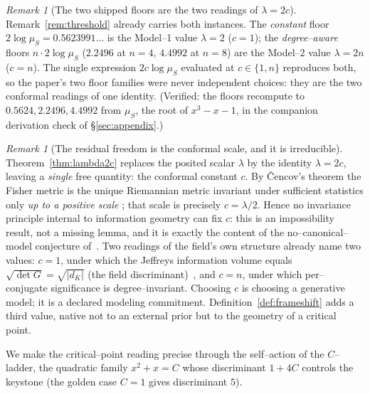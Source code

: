 \documentclass[11pt]{article}
\theoremstyle{plain}
\theoremstyle{definition}
\theoremstyle{remark}
\newtheorem{remark}[theorem]{Remark}
\newcommand{\K}{K}
\newcommand{\GG}{G}
\begin{document}
\begin{remark}[The two shipped floors are the two readings of $\lambda=2c$]\label{rem:floorsunify}
Remark~\ref{rem:threshold} already carries both instances. The \emph{constant} floor $2\log\mu_S=0.5623991\ldots$
is the Model--1 value $\lambda=2$ ($c=1$); the \emph{degree--aware} floors $n\cdot2\log\mu_S$ ($2.2496$ at $n=4$,
$4.4992$ at $n=8$) are the Model--2 value $\lambda=2n$ ($c=n$). The single expression $2c\log\mu_S$ evaluated at
$c\in\{1,n\}$ reproduces both, so the paper's two floor families were never independent choices: they are the two
conformal readings of one identity. (Verified: the floors recompute to $0.5624,2.2496,4.4992$ from $\mu_S$, the
root of $x^3-x-1$, in the companion derivation check of \S\ref{sec:appendix}.)
\end{remark}

\begin{remark}[The residual freedom is the conformal scale, and it is irreducible]\label{rem:cencov}
Theorem~\ref{thm:lambda2c} replaces the posited scalar $\lambda$ by the identity $\lambda=2c$, leaving a
\emph{single} free quantity: the conformal constant $c$. By \v{C}encov's theorem the Fisher metric is the unique
Riemannian metric invariant under sufficient statistics only \emph{up to a positive scale} \cite{Cencov}; that
scale is precisely $c=\lambda/2$. Hence no invariance principle internal to information geometry can fix $c$:
this is an impossibility result, not a missing lemma, and it is exactly the content of the no--canonical--model
conjecture of~\cite{VectorSubstrate}. Two readings of the field's own structure already name two values: $c=1$, under which
the Jeffreys information volume equals $\sqrt{\det\GG}=\sqrt{|d_\K|}$ (the field discriminant)~\cite{Jeffreys,
VectorSubstrate}, and $c=n$, under which per--conjugate significance is degree--invariant. Choosing $c$ is
choosing a generative model; it is a declared modeling commitment. Definition~\ref{def:frameshift} adds a third
value, native not to an external prior but to the geometry of a critical point.
\end{remark}

We make the critical--point reading precise through the self--action of the $C$--ladder, the quadratic family
$x^2+x=C$ whose discriminant $1+4C$ controls the keystone (the golden case $C=1$ gives discriminant $5$).
\end{document}
